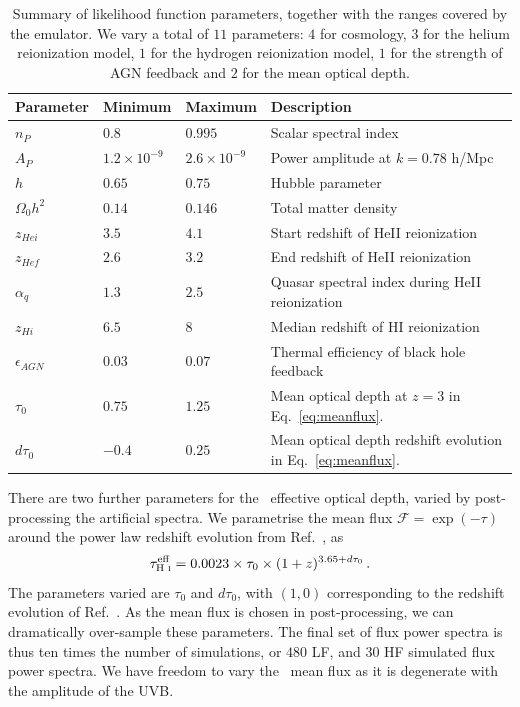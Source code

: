 \begin{table}
\begin{centering}
  \begin{tabular}{llll}
  \hline
  Parameter & Minimum & Maximum & Description \\
    \hline
    $n_P$  &  $0.8$  & $0.995$ & Scalar spectral index \\
    $A_P$  &  $1.2 \times 10^{-9}$  & $2.6 \times 10^{-9}$ & Power amplitude at $k = 0.78$ h/Mpc \\
    $h$    & $0.65$  & $0.75$ & Hubble parameter \\
    $\Omega_0 h^2$ & $0.14$ & $0.146$ & Total matter density \\
    $z_{Hei}$      & $3.5$  & $4.1$  & Start redshift of HeII reionization \\
    $z_{Hef}$      & $2.6$  & $3.2$  & End redshift of HeII reionization \\
    $\alpha_q$     & $1.3$  & $2.5$ & Quasar spectral index during HeII reionization  \\
    $z_{Hi}$        & $6.5$ & $8$   & Median redshift of HI reionization \\
    $\epsilon_{AGN}$ & $0.03$ & $0.07$ & Thermal efficiency of black hole feedback \\
    $\tau_0$ & $0.75$ & $1.25$ & Mean optical depth at $z=3$ in Eq.~\ref{eq:meanflux}.\\
    $d \tau_0$ & $-0.4$ & $0.25$ & Mean optical depth redshift evolution in Eq.~\ref{eq:meanflux}. \\
    \hline
  \end{tabular}
  \caption{Summary of likelihood function parameters, together with the ranges covered by the emulator. We vary a total of $11$ parameters: $4$ for cosmology, $3$ for the helium reionization model, $1$ for the hydrogen reionization model, $1$ for the strength of AGN feedback and $2$ for the mean optical depth.}
  \label{tab:emulatorparams}
  \end{centering}
\end{table}

There are two further parameters for the \Lya~effective optical depth, varied by post-processing the artificial spectra. We parametrise the mean flux $\mathcal{F} = \exp(-\tau)$ around the power law redshift evolution from Ref.~\cite{2007MNRAS.382.1657K}, as
\begin{equation}
\tau^{\text{eff}}_{\text{H~{\sc i}}} = 0.0023 \times \tau_0 \times (1+z)^{3.65 + d\tau_0}\,.
 \label{eq:meanflux}
\end{equation}
The parameters varied are $\tau_0$ and $d\tau_0$, with $(1, 0)$ corresponding to the redshift evolution of Ref.~\cite{2007MNRAS.382.1657K}.
As the mean flux is chosen in post-processing, we can dramatically over-sample these parameters. The final set of flux power spectra is thus ten times the number of simulations, or $480$ LF, and $30$ HF simulated flux power spectra. We have freedom to vary the \Lya~mean flux as it is degenerate with the amplitude of the UVB. 

